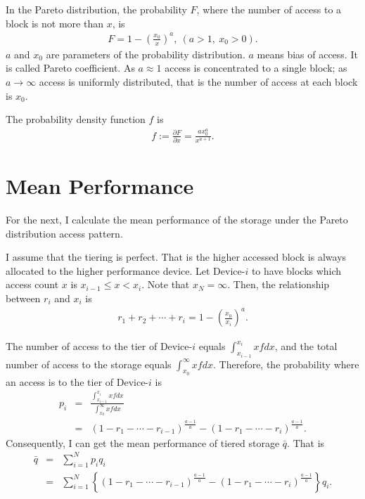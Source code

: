 \documentclass[a4paper,11pt]{article}
\begin{document}
In the Pareto distribution, the probability $F$, where the number of
access to a block is not more than $x$, is
\begin{eqnarray}
  F = 1 - \left(\frac{x_0}{x}\right)^a,\
    (a > 1,\ x_0 > 0).
\end{eqnarray}
$a$ and $x_0$ are parameters of the probability distribution. $a$ means
bias of access. It is called Pareto coefficient. As $a \approx 1$ access
is concentrated to a single block; as $a \to \infty$ access is uniformly
distributed, that is the number of access at each block is $x_0$.


The probability density function $f$ is
\begin{eqnarray}
  f := \frac{\partial F}{\partial x}
      = \frac{a x_0^a}{x^{a+1}}.
\end{eqnarray}

\section{Mean Performance}


For the next, I calculate the mean performance of the storage under the Pareto distribution access pattern.


I assume that the tiering is perfect. That is the higher accessed block
is always allocated to the higher performance device. Let Device-$i$ to
have blocks which access count $x$ is $x_{i-1} \leq x < x_i$. Note that
$x_N = \infty$. Then, the relationship between $r_i$ and $x_i$ is
\begin{eqnarray}
  r_1+r_2+\cdots+r_i=1-\left(\frac{x_0}{x_i}\right)^a.
\end{eqnarray}


The number of access to the tier of Device-$i$ equals
$\int_{x_{i-1}}^{x_i} x f dx$, and the total number of access to the
storage equals $\int_{x_0}^{\infty} x f dx$.
Therefore, the probability where an access is to the tier of Device-$i$ is
\begin{eqnarray}
  p_i &=& \frac{\displaystyle{\int_{x_{i-1}}^{x_i} x f dx}}{\displaystyle{\int_{x_0}^{\infty} x f dx}} \nonumber\\
      &=& \left(1-r_1-\cdots-r_{i-1}\right)^\frac{a-1}{a}
        -\left(1-r_1-\cdots-r_i\right)^\frac{a-1}{a}.
\end{eqnarray}
Consequently, I can get the mean performance of tiered storage $\bar{q}$.
That is
\begin{eqnarray}
  \bar{q}&=&\sum_{i=1}^N p_i q_i \nonumber\\
         &=&\sum_{i=1}^N \left\{ \left(1-r_1-\cdots-r_{i-1}\right)^\frac{a-1}{a}
                        -\left(1-r_1-\cdots-r_i    \right)^\frac{a-1}{a}
  \right\} q_i. \label{mean_quality}
\end{eqnarray}
\end{document}

